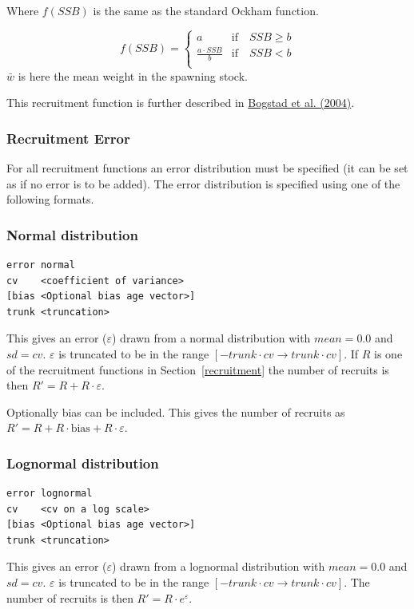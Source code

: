 \documentclass[12pt,twoside,a4paper]{article}
\begin{document}
Where $f(SSB)$ is the same as the standard Ockham function.

\[
f(SSB)=\left\{\begin{array}{ll}
    a & \textrm{if} \quad SSB \ge b \\
    \frac{a \cdot SSB}{b} & \textrm{if} \quad SSB < b \\
  \end{array}
  \right.
\]
$\bar{w}$ is here the mean weight in the spawning stock.

This recruitment function is further described in 
\hyperlink{bogstad}{Bogstad et al. (2004)}.

\subsubsection{Recruitment Error}

For all recruitment functions an error distribution must be
specified (it can be set as  if no error is to be
added). The error distribution is specified using one of the following
formats. 

\subsubsection*{Normal distribution}
\begin{verbatim}
error normal
cv    <coefficient of variance>
[bias <Optional bias age vector>]
trunk <truncation>
\end{verbatim}
This gives an error ($\varepsilon$) drawn from a normal distribution
with $mean=0.0$ and $sd=cv$. $\varepsilon$ is truncated to be
in the range $[-trunk\cdot cv \rightarrow trunk\cdot cv]$. If $R$ is
one of the recruitment functions in Section~\ref{recruitment} the
number of recruits is then $R'=R+R\cdot \varepsilon$.

Optionally bias can be included. This gives the number of recruits as
$R'=R+R\cdot\mathrm{bias}+R\cdot \varepsilon$.


\subsubsection*{Lognormal distribution}
\begin{verbatim}
error lognormal
cv    <cv on a log scale>
[bias <Optional bias age vector>]
trunk <truncation>
\end{verbatim}
This gives an error ($\varepsilon$) drawn from a lognormal distribution
with $mean=0.0$ and $sd=cv$. $\varepsilon$ is truncated to be
in the range $[-trunk\cdot cv \rightarrow trunk\cdot cv]$. The
number of recruits is then $R'=R{\cdot}e^{\varepsilon}$.
\end{document}
